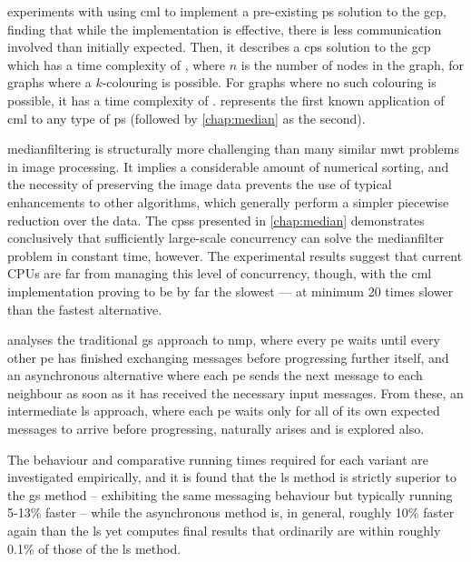  experiments with using \gls{cml} to implement a pre-existing \gls{ps} solution to the \gls{gcp}, finding that while the implementation is effective, there is less communication involved than initially expected.  Then, it describes a \gls{cps} solution to the \gls{gcp} which has a time complexity of , where \(n\) is the number of nodes in the graph, for graphs where a \(k\)-colouring is possible.  For graphs where no such colouring is possible, it has a time complexity of .   represents the first known application of \gls{cml} to any type of \gls{ps} (followed by \cref{chap:median} as the second).

\Gls{medianfilter}ing is structurally more challenging than many similar \gls{mwt} problems in image processing.  It implies a considerable amount of numerical sorting, and the necessity of preserving the image data prevents the use of typical enhancements to other algorithms, which generally perform a simpler piecewise reduction over the data.  The \glspl{cps} presented in \cref{chap:median} demonstrates conclusively that sufficiently large-scale concurrency can solve the \gls{medianfilter} problem in constant time, however.  The experimental results suggest that current CPUs are far from managing this level of concurrency, though, with the \gls{cml} implementation proving to be by far the slowest --- at minimum 20 times slower than the fastest alternative.

 analyses the traditional \gls{gs} approach to \gls{nmp}, where every \gls{pe} waits until every other \gls{pe} has finished exchanging messages before progressing further itself, and an asynchronous alternative where each \gls{pe} sends the next message to each neighbour as soon as it has received the necessary input messages.  From these, an intermediate \gls{ls} approach, where each \gls{pe} waits only for all of its own expected messages to arrive before progressing, naturally arises and is explored also.

The behaviour and comparative running times required for each variant are investigated empirically, and it is found that the \gls{ls} method is strictly superior to the \gls{gs} method -- exhibiting the same messaging behaviour but typically running 5-13\% faster -- while the asynchronous method is, in general, roughly 10\% faster again than the \gls{ls} yet computes final results that ordinarily are within roughly 0.1\% of those of the \gls{ls} method.